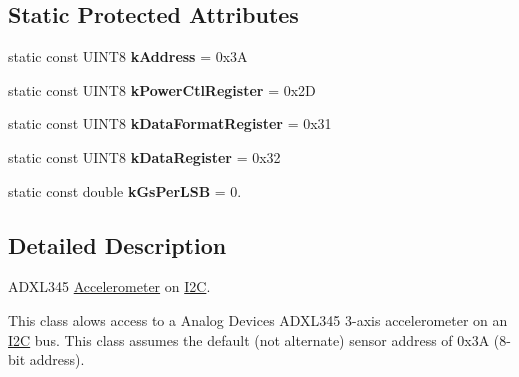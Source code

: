 \subsection*{\-Static \-Protected \-Attributes}
\begin{DoxyCompactItemize}
\item 
\hypertarget{classADXL345__I2C_a20a25b8eb9b276134dcc20e81bcd340b}{static const \-U\-I\-N\-T8 {\bfseries k\-Address} = 0x3\-A}\label{classADXL345__I2C_a20a25b8eb9b276134dcc20e81bcd340b}

\item 
\hypertarget{classADXL345__I2C_a2dce6a94c87536354d77580a077c3778}{static const \-U\-I\-N\-T8 {\bfseries k\-Power\-Ctl\-Register} = 0x2\-D}\label{classADXL345__I2C_a2dce6a94c87536354d77580a077c3778}

\item 
\hypertarget{classADXL345__I2C_a76a0e0b8c1e410712304de8ab43929fa}{static const \-U\-I\-N\-T8 {\bfseries k\-Data\-Format\-Register} = 0x31}\label{classADXL345__I2C_a76a0e0b8c1e410712304de8ab43929fa}

\item 
\hypertarget{classADXL345__I2C_a7d46af99a08cd5c900db158b0ea83141}{static const \-U\-I\-N\-T8 {\bfseries k\-Data\-Register} = 0x32}\label{classADXL345__I2C_a7d46af99a08cd5c900db158b0ea83141}

\item 
\hypertarget{classADXL345__I2C_a01a8e14f6879111accaf89c922a29c96}{static const double {\bfseries k\-Gs\-Per\-L\-S\-B} = 0.}\label{classADXL345__I2C_a01a8e14f6879111accaf89c922a29c96}

\end{DoxyCompactItemize}


\subsection{\-Detailed \-Description}
\-A\-D\-X\-L345 \hyperlink{classAccelerometer}{\-Accelerometer} on \hyperlink{classI2C}{\-I2\-C}.

\-This class alows access to a \-Analog \-Devices \-A\-D\-X\-L345 3-\/axis accelerometer on an \hyperlink{classI2C}{\-I2\-C} bus. \-This class assumes the default (not alternate) sensor address of 0x3\-A (8-\/bit address). 

